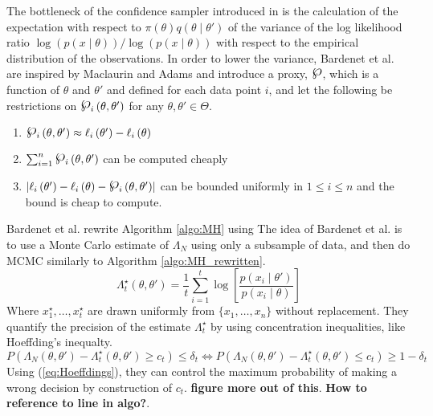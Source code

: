 \documentclass{article}
\theoremstyle{definition}
\newcommand{\powerset}{\raisebox{.15\baselineskip}{\Large\ensuremath{\wp}}}
\begin{document}
The bottleneck of the confidence sampler introduced in \cite{Bardenet:2} is the calculation of the expectation with respect to $\pi\left(\theta\right)q\left(\theta \mid \theta'\right)$ of the variance of the log likelihood ratio $\log \left(p\left(x\mid \theta\right)\right) / \log \left(p\left(x\mid \theta\right)\right)$ with respect to the empirical distribution of the observations.
In order to lower the variance, Bardenet et al. are inspired by Maclaurin and Adams and introduce a proxy, $\powerset$, which is a function of $\theta$ and $\theta'$ and defined for each data point $i$, and let the following be restrictions on $\powerset_i\left(\theta, \theta'\right)$ for any $\theta, \theta' \in \Theta$. 
\begin{enumerate}
    \item $\powerset_i\left(\theta, \theta'\right) \approx \ell_i\left(\theta'\right) - \ell_i\left(\theta\right)$
    \item $ \sum_{i = 1}^n \powerset_i\left(\theta, \theta'\right)$ can be computed cheaply
    \item $\left| \ell_i\left(\theta'\right) - \ell_i\left(\theta\right) - \powerset_i\left(\theta, \theta'\right)\right|$ can be bounded uniformly in $1\leq i \leq n$ and the bound is cheap to compute. 
\end{enumerate}
Bardenet et al. rewrite Algorithm \ref{algo:MH} using 
The idea of Bardenet et al. \cite{Bardenet:2} is to use a Monte Carlo estimate of $\Lambda_N$ using only a subsample of data,  and then do MCMC similarly to Algorithm \ref{algo:MH_rewritten}. 
\begin{equation*}
    \Lambda^{\star}_t\left(\theta, \theta'\right) = \frac{1}{t}\sum_{i = 1}^t \log\left[\frac{p\left(x_i\mid\theta'\right)}{p\left(x_i\mid \theta\right)}\right] 
\end{equation*}
Where $x^{\star}_1, \ldots, x^{\star}_t$ are drawn uniformly from $\{x_1, \ldots, x_n\}$ without replacement.  
They quantify the precision of the estimate $\Lambda_t^{\star}$ by using concentration inequalities, like Hoeffding's inequalty.  \begin{equation}\label{eq:Hoeffdings}
    P\left(\Lambda_N \left(\theta, \theta'\right) - \Lambda_t^{\star}\left(\theta, \theta'\right) \geq c_t \right) \leq \delta_t \iff P\left(\Lambda_N\left(\theta, \theta'\right) - \Lambda_t^{\star}\left(\theta, \theta'\right) \leq c_t\right) \geq 1 - \delta_t 
\end{equation}
Using (\ref{eq:Hoeffdings}), they can control the maximum probability of making a wrong decision by construction of $c_t$.  \textbf{figure more out of this}. \textbf{How to reference to line in algo?}. 
\end{document}
